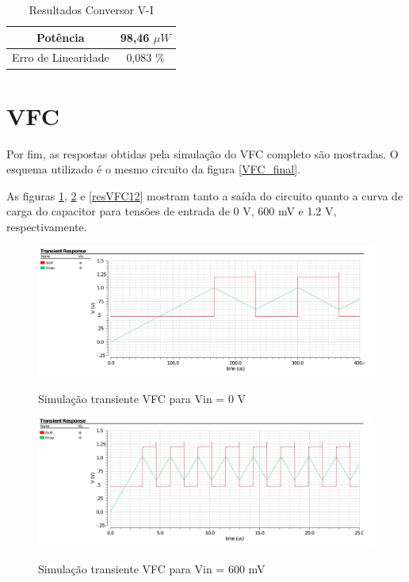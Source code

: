\documentclass[
	12pt,				%
	oneside,			%
	a4paper,			%
	english,			%
	french,				%
	spanish,			%
	brazil				%
	]{abntex2}
\begin{document}
\begin{table}[h]
    \begin{center}    
    \begin{tabular}{ | c | c | }
    \hline
    Potência  & 98,46 $\mu W $ \\
    \hline
    Erro de Linearidade  & 0,083 \% \\
    \hline
    \end{tabular}
    \caption[Resultados Conversor V-I]{Resultados Conversor V-I}
    \label{tabFFVA}
    \end{center}
\end{table}

\section{VFC}
Por fim, as respostas obtidas pela simulação do VFC completo são mostradas. O esquema utilizado é o mesmo circuito da figura \ref{VFC_final}.

As figuras \ref{resVFC0}, \ref{resVFC600} e \ref{resVFC12} mostram tanto a saída do circuito quanto a curva de carga do capacitor para tensões de entrada de 0 V, 600 mV e 1.2 V, respectivamente.

\begin{figure}[!ht]
  \centering
  \includegraphics[width=450pt]{saidaVFC0.jpg}\\
  \caption{Simulação transiente VFC para Vin = 0 V}\label{resVFC0}
\end{figure}

\begin{figure}[!ht]
  \centering
  \includegraphics[width=450pt]{saidaVFC600.jpg}\\
  \caption{Simulação transiente VFC para Vin = 600 mV}\label{resVFC600}
\end{figure}
\end{document}

